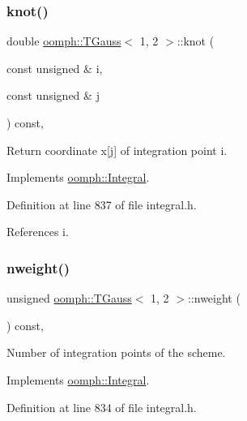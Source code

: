 \subsubsection{\texorpdfstring{knot()}{knot()}}
{\footnotesize\ttfamily double \hyperlink{classoomph_1_1TGauss}{oomph\+::\+T\+Gauss}$<$ 1, 2 $>$\+::knot (\begin{DoxyParamCaption}\item[{const unsigned \&}]{i,  }\item[{const unsigned \&}]{j }\end{DoxyParamCaption}) const\hspace{0.3cm}{\ttfamily [inline]}, {\ttfamily [virtual]}}



Return coordinate x\mbox{[}j\mbox{]} of integration point i. 



Implements \hyperlink{classoomph_1_1Integral_a1a2122f99a87c18649bafdd9ed739758}{oomph\+::\+Integral}.



Definition at line 837 of file integral.\+h.



References i.

\mbox{\label{classoomph_1_1TGauss_3_011_00_012_01_4_a546f04f82b636766fafc6ee0fc7bbae2}} 
\subsubsection{\texorpdfstring{nweight()}{nweight()}}
{\footnotesize\ttfamily unsigned \hyperlink{classoomph_1_1TGauss}{oomph\+::\+T\+Gauss}$<$ 1, 2 $>$\+::nweight (\begin{DoxyParamCaption}{ }\end{DoxyParamCaption}) const\hspace{0.3cm}{\ttfamily [inline]}, {\ttfamily [virtual]}}



Number of integration points of the scheme. 



Implements \hyperlink{classoomph_1_1Integral_a1a270de9d99a1fcf1d25a6c1017f65fa}{oomph\+::\+Integral}.



Definition at line 834 of file integral.\+h.

